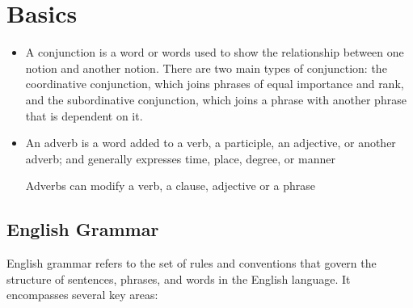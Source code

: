 \documentclass{book}
\begin{document}
\frontmatter
\tableofcontents
\clearpage

\mainmatter
\raggedright

\part{Basics}

\begin{itemize}
	\item {}
	      
	      A conjunction is a word or words used to show the relationship between one notion and another notion. There are two main types of conjunction: the coordinative conjunction, which joins phrases of equal importance and rank, and the subordinative conjunction, which joins a phrase with another phrase that is dependent on it. 
	      
	\item {}
	      
	      An adverb is a word added to a verb, a participle, an adjective, or another adverb; and generally expresses time, place, degree, or manner
	      
	      Adverbs can modify a verb, a clause, adjective or a phrase
	      
\end{itemize}

\chapter{English Grammar}

English grammar refers to the set of rules and conventions that govern the structure of sentences, phrases, and words in the English language. It encompasses several key areas:
\end{document}
